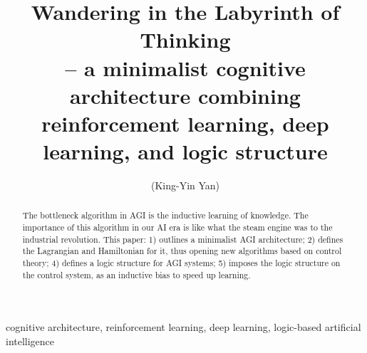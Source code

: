 \documentclass[orivec]{llncs}
\title{Wandering in the Labyrinth of Thinking\\
\normalsize{-- a minimalist cognitive architecture combining\\
reinforcement learning, deep learning, and logic structure}}
\author{\usebox{\MyName} (King-Yin Yan)
}
\institute{General.Intelligence@Gmail.com}
\begin{document}
\maketitle

\setlength{\parindent}{0em}
\setlength{\parskip}{2.8ex plus0.8ex minus0.8ex}

\begin{abstract}
The bottleneck algorithm in AGI is the inductive learning of knowledge.  The importance of this algorithm in our AI era is like what the steam engine was to the industrial revolution.  This paper: 1) outlines a minimalist AGI architecture; 2) defines the Lagrangian and Hamiltonian for it, thus opening new algorithms based on control theory; 4) defines a logic structure for AGI systems; 5) imposes the logic structure on the control system, as an inductive bias to speed up learning.
\end{abstract}

\begin{keywords}
cognitive architecture, reinforcement learning, deep learning, logic-based artificial intelligence
\end{keywords}
\end{document}
